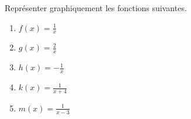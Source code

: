 
\begin{exercice}\label{exosmath-0275}

    Représenter graphiquement les fonctions suivantes.
    \begin{multicols}{2}
        \begin{enumerate}
            \item
                \( f(x)=\frac{1}{ x }\)
            \item
                \( g(x)=\frac{ 2 }{ x }\)
            \item
                \( h(x)=-\frac{ 1 }{ x }\)
            \item
                \( k(x)=\frac{ 1 }{ x+4 }\)
            \item
                \( m(x)=\frac{1}{ x-3 }\)
        \end{enumerate}
    \end{multicols}

\end{exercice}
